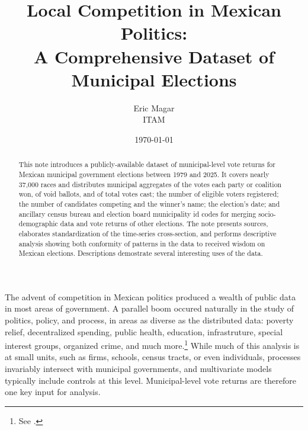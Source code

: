 \documentclass[letter,12pt]{article}
\begin{document}
\title{Local Competition in Mexican Politics: \\ A Comprehensive Dataset of Municipal Elections}
\author{Eric Magar \\ ITAM}
\date{\today}
\maketitle

\begin{abstract}
\noindent This note introduces a publicly-available dataset of municipal-level vote returns for Mexican municipal government elections between 1979 and 2025. It covers nearly 37,000 races and distributes municipal aggregates of the votes each party or coalition won, of void ballots, and of total votes cast; the number of eligible voters registered; the number of candidates competing and the winner's name; the election's date; and ancillary census bureau and election board municipality id codes for merging socio-demographic data and vote returns of other elections. The note presents sources, elaborates standardization of the time-series cross-section, and performs descriptive analysis showing both conformity of patterns in the data to received wisdom on Mexican elections. Descriptions demostrate several interesting uses of the data.
\end{abstract}

\noindent The advent of competition in Mexican politics produced a wealth of public data in most areas of government. A parallel boom occured naturally in the study of politics, policy, and process, in areas as diverse as the distributed data: poverty relief, decentralized spending, public health, education, infrastruture, special interest groups, organized crime, and much more.\footnote{See \citet{diaz-estevez-magaloni-Poverty-book.2016, delao.cctransfers.2013, cantuGroceries2019, hernandez.jaramillo.FiscalDescentralMx2008wd, king.etal.segPop.2007, frenk.2006, behrman.etal.Prospera2025qe, avitabile.dehoyos.2018, garfias.etal.Infrastructure2021, palmer.rubin.Patronage2019cps, dube.garcia.ponce-MaizeDrugs2016jeea, dell.DrugWar.2015aer}.}  While much of this analysis is at small units, such as firms, schools, census tracts, or even individuals, processes invariably intersect with municipal governments, and multivariate models typically include controls at this level. Municipal-level vote returns are therefore one key input for analysis. 
\end{document}
